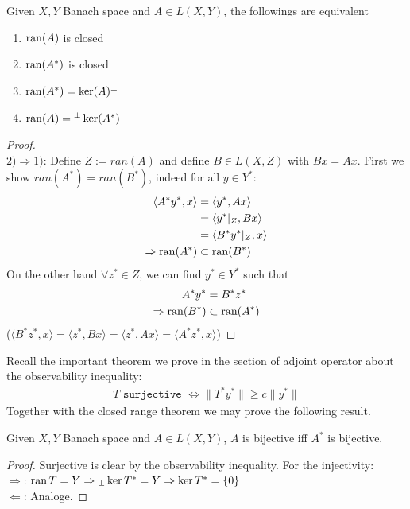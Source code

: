 \begin{theorem}
	Given $X, Y$ Banach space and $A \in L(X,Y)$, the followings are equivalent
	\begin{enumerate}
		\item $\operatorname{ran}(A)$ is closed
		\item $\operatorname{ran}(A^*)$ is closed
		\item $\operatorname{ran}(A^*) = \ker(A)^\perp$
		\item $\operatorname{ran}(A) = {}^\perp\ker(A^*)$ 
	\end{enumerate}
\end{theorem}
\begin{proof}\quad\\
$2)\Rightarrow 1)$: Define $Z:= ran(A)$ and define $B \in L(X,Z)$ with $Bx = Ax$. First we show $ran(A^*) = ran(B^*)$, indeed for all $y \in Y^*:$
\begin{align*}
	\langle A^*y^*, x\rangle &= \langle y^*, Ax\rangle\\
	&= \langle y^*|_Z, Bx\rangle\\
	&= \langle B^* y^*|_Z, x \rangle \\
	\Rightarrow \operatorname{ran}(A^*) &\subset \operatorname{ran}(B^*)
\end{align*}
On the other hand $\forall z^* \in Z$, we can find $y^* \in Y^*$ such that 
\begin{align*}
	A^* y^* &= B^* z^*\\
	\Rightarrow \operatorname{ran}(B^*) &\subset \operatorname{ran}(A^*)
\end{align*}
($\langle B^* z^*, x\rangle = \langle z^*, Bx\rangle = \langle z^*, Ax\rangle = \langle A^* z^*, x\rangle$)
\end{proof}

Recall the important theorem we prove in the section of adjoint operator about the observability inequality:
\begin{align*}
	T\texttt{ surjective } \Leftrightarrow \|T^* y^*\| \ge c \|y^*\|
\end{align*}
Together with the closed range theorem we may prove the following result. 

\begin{corollary}
	Given $X, Y$ Banach space and $A \in L(X, Y)$, $A$ is bijective iff $A^*$ is bijective.
\end{corollary}
\begin{proof}
Surjective is clear by the observability inequality. For the injectivity:\\
$\Rightarrow$: $\operatorname{ran} T = Y \Rightarrow {}_\perp \ker T^* = Y \Rightarrow \ker T^* = \{0 \}$ \\
$\Leftarrow$: Analoge.  
\end{proof}

